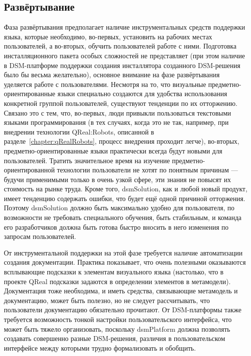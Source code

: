 \subsection{Развёртывание}
Фаза развёртывания предполагает наличие инструментальных средств поддержки языка, 
которые необходимо, во-первых, установить на рабочих местах пользователей, а во-вторых, 
обучить пользователей работе с ними. Подготовка инсталляционного пакета особых сложностей 
не представляет (при этом наличие в DSM-платформе поддержки создания инсталлятора созданного 
DSM-решения было бы весьма желательно), основное внимание на фазе развёртывания уделяется 
работе с пользователями. Несмотря на то, что визуальные предметно-ориентированные 
языки специально создаются для удобства использования конкретной группой пользователей, 
существуют тенденции по их отторжению. Связано это с тем, что, во-первых, люди привыкли 
пользоваться текстовыми языками программирования (в тех случаях, когда это не так, например, 
при внедрении технологии QReal:Robots, описанной в разделе~\ref{chapter:qRealRobots}, 
процесс внедрения проходит легче), во-вторых, предметно-ориентированные языки практически 
всегда будут новыми для пользователей. Тратить значительное время на изучение предметно-ориентированной 
технологии пользователи не хотят по понятным причинам --- будучи применимыми только 
в очень узкой сфере, эти знания не повысят их стоимость на рынке труда. Кроме того, 
\ac{dsmSolution}, как и любой новый продукт, имеет тенденцию содержать ошибки, что будет 
ещё одной причиной отторжения. Поэтому \ac{dsmSolution} должно быть максимально удобно для 
пользователя, по возможности не требовать специального обучения, быть стабильным, 
и команда его разработчиков должна быть готова быстро вносить в него изменения по 
запросам пользователей.

От инструментальной поддержки на этой фазе требуется наличие автоматизации создания 
документации. Практика показывает, что очень полезными оказываются всплывающие подсказки 
к элементам визуального языка (настолько, что в проекте QReal подсказки задаются в 
определении элементов в метамодели). Документация тоже необходима, и иметь средства, 
связывающие метамодель и документацию, может быть полезно, но не следует рассчитывать, 
что пользователи документацию обязательно прочитают. От DSM-платформы также требуется 
возможность тонкой настройки пользовательского интерфейса, что может быть тяжело организовать,
поскольку \ac{dsmPlatform} должна позволять создавать совершенно разные DSM-решения, 
различия в пользовательском интерфейсе между которыми трудно формализовать и обобщить.

